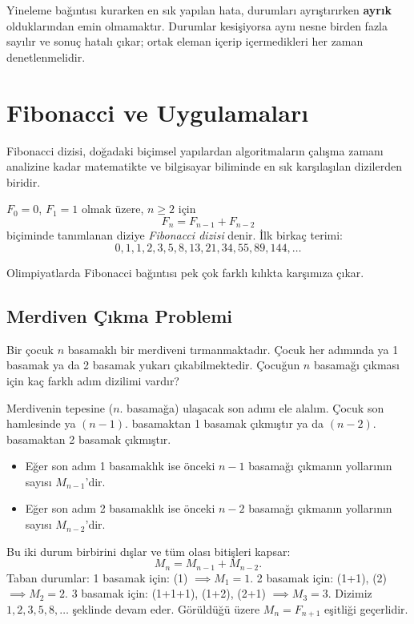 \begin{caution}
Yineleme bağıntısı kurarken en sık yapılan hata, durumları ayrıştırırken \textbf{ayrık} olduklarından emin olmamaktır. Durumlar kesişiyorsa aynı nesne birden fazla sayılır ve sonuç hatalı çıkar; ortak eleman içerip içermedikleri her zaman denetlenmelidir.
\end{caution}

\section{Fibonacci ve Uygulamaları}

Fibonacci dizisi, doğadaki biçimsel yapılardan algoritmaların çalışma zamanı analizine kadar matematikte ve bilgisayar biliminde en sık karşılaşılan dizilerden biridir.

\begin{definition}
$F_0 = 0$, $F_1 = 1$ olmak üzere, $n \ge 2$ için
\[
F_n = F_{n-1} + F_{n-2}
\]
biçiminde tanımlanan diziye \emph{Fibonacci dizisi} denir. İlk birkaç terimi:
\[
0, 1, 1, 2, 3, 5, 8, 13, 21, 34, 55, 89, 144, \dots
\]
\end{definition}

Olimpiyatlarda Fibonacci bağıntısı pek çok farklı kılıkta karşımıza çıkar.

\subsection{Merdiven Çıkma Problemi}

Bir çocuk $n$ basamaklı bir merdiveni tırmanmaktadır. Çocuk her adımında ya 1 basamak ya da 2 basamak yukarı çıkabilmektedir. Çocuğun $n$ basamağı çıkması için kaç farklı adım dizilimi vardır?

Merdivenin tepesine ($n$. basamağa) ulaşacak son adımı ele alalım. Çocuk son hamlesinde ya $(n-1)$. basamaktan 1 basamak çıkmıştır ya da $(n-2)$. basamaktan 2 basamak çıkmıştır. 

\begin{itemize}
    \item Eğer son adım 1 basamaklık ise önceki $n-1$ basamağı çıkmanın yollarının sayısı $M_{n-1}$'dir.
    \item Eğer son adım 2 basamaklık ise önceki $n-2$ basamağı çıkmanın yollarının sayısı $M_{n-2}$'dir.
\end{itemize}
Bu iki durum birbirini dışlar ve tüm olası bitişleri kapsar:
\[
M_n = M_{n-1} + M_{n-2}.
\]
Taban durumlar:
1 basamak için: (1) $\implies M_1 = 1$.
2 basamak için: (1+1), (2) $\implies M_2 = 2$.
3 basamak için: (1+1+1), (1+2), (2+1) $\implies M_3 = 3$.
Dizimiz $1, 2, 3, 5, 8, \dots$ şeklinde devam eder. Görüldüğü üzere $M_n = F_{n+1}$ eşitliği geçerlidir.

